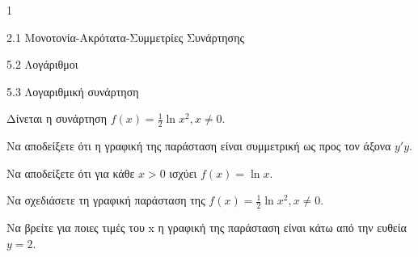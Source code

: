 \begin{ylh}{1}
\item 2.1 Μονοτονία-Ακρότατα-Συμμετρίες Συνάρτησης
\item 5.2 Λογάριθμοι
\item 5.3 Λογαριθμική συνάρτηση
\end{ylh}
Δίνεται η συνάρτηση $f(x) = \frac{1}{2} \ln x^2, x \neq 0$.
\begin{alist}
\item Να αποδείξετε ότι η γραφική της παράσταση είναι συμμετρική ως προς τον άξονα $y'y$.
\item Να αποδείξετε ότι για κάθε $x > 0$ ισχύει $f(x) = \ln x$.
\item Να σχεδιάσετε τη γραφική παράσταση της $f(x) = \frac{1}{2} \ln x^2, x \neq 0$.
\item Να βρείτε για ποιες τιμές του x η γραφική της παράσταση είναι κάτω από την ευθεία $y = 2$.
\end{alist}

